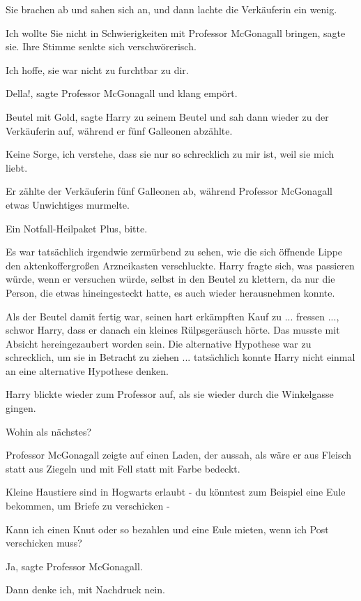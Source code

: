 Sie brachen ab und sahen sich an, und dann lachte die Verkäuferin ein wenig.

\glqq{}Ich wollte Sie nicht in Schwierigkeiten mit Professor McGonagall
bringen\grqq{}, sagte sie. Ihre Stimme senkte sich verschwörerisch.

\glqq{}Ich hoffe, sie war nicht zu furchtbar zu dir.\grqq{}

\glqq{}Della!\grqq{}, sagte Professor McGonagall und klang empört.

\glqq{}Beutel mit Gold\grqq{}, sagte Harry zu seinem Beutel und sah dann wieder
zu der Verkäuferin auf, während er fünf Galleonen abzählte.

\glqq{}Keine Sorge, ich verstehe, dass sie nur so schrecklich zu mir ist, weil
sie mich liebt.\grqq{}

Er zählte der Verkäuferin fünf Galleonen ab, während Professor McGonagall etwas
Unwichtiges murmelte.

\glqq{}Ein Notfall-Heilpaket Plus, bitte.\grqq{}

Es war tatsächlich irgendwie zermürbend zu sehen, wie die sich öffnende Lippe
den aktenkoffergroßen Arzneikasten verschluckte. Harry fragte sich, was
passieren würde, wenn er versuchen würde, selbst in den Beutel zu klettern, da
nur die Person, die etwas hineingesteckt hatte, es auch wieder herausnehmen
konnte.

Als der Beutel damit fertig war, seinen hart erkämpften Kauf zu ... fressen ...,
schwor Harry, dass er danach ein kleines Rülpsgeräusch hörte. Das musste mit
Absicht hereingezaubert worden sein. Die alternative Hypothese war zu
schrecklich, um sie in Betracht zu ziehen ... tatsächlich konnte Harry nicht
einmal an eine alternative Hypothese denken.

Harry blickte wieder zum Professor auf, als sie wieder durch die Winkelgasse
gingen.

\glqq{}Wohin als nächstes?\grqq{}

Professor McGonagall zeigte auf einen Laden, der aussah, als wäre er aus Fleisch
statt aus Ziegeln und mit Fell statt mit Farbe bedeckt.

\glqq{}Kleine Haustiere sind in Hogwarts erlaubt - du könntest zum Beispiel eine
Eule bekommen, um Briefe zu verschicken -\grqq{}

\glqq{}Kann ich einen Knut oder so bezahlen und eine Eule mieten, wenn ich Post
verschicken muss?\grqq{}

\glqq{}Ja\grqq{}, sagte Professor McGonagall.

\glqq{}Dann denke ich, mit Nachdruck nein.\grqq{}

